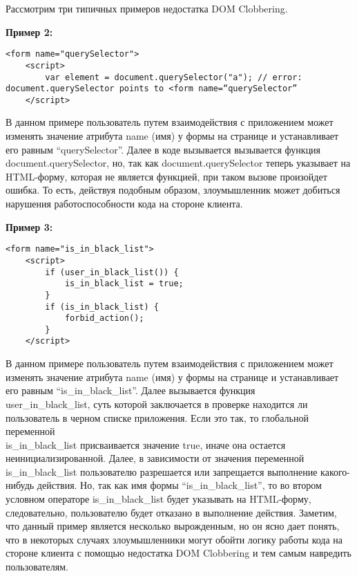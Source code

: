 Рассмотрим три типичных примеров недостатка DOM Clobbering.

\bigskip
\textbf{Пример 2:}


\begin{lstlisting}[caption=вызов ошибки]
	<form name="querySelector">
	<script>
		var element = document.querySelector("a"); // error: document.querySelector points to <form name=“querySelector”
	</script>
\end{lstlisting}
\bigskip

В данном примере пользователь путем взаимодействия с приложением может изменять значение атрибута name (имя) у формы на странице и устанавливает его равным “querySelector”. Далее в коде вызывается вызывается функция document.querySelector, но, так как document.querySelector теперь указывает на \\HTML-форму, которая не является функцией, при таком вызове произойдет ошибка.
То есть, действуя подобным образом, злоумышленник может добиться нарушения работоспособности кода на стороне клиента.

\bigskip
\textbf{Пример 3:}

\begin{lstlisting}[caption=обход логики программы]
	<form name="is_in_black_list">
	<script>
		if (user_in_black_list()) {
			is_in_black_list = true;
		}
		if (is_in_black_list) {
			forbid_action();
		}
	</script>
\end{lstlisting}
\bigskip

В данном примере пользователь путем взаимодействия с приложением может изменять значение атрибута name (имя) у формы на странице и устанавливает его равным “is\_in\_black\_list”. Далее вызывается функция \\user\_in\_black\_list, суть которой заключается в проверке находится ли пользователь в черном списке приложения. Если это так, то глобальной переменной \\is\_in\_black\_list присваивается значение true, иначе она остается неинициализированной. Далее, в зависимости от значения переменной is\_in\_black\_list пользователю разрешается или запрещается выполнение какого-нибудь действия. Но, так как имя формы  “is\_in\_black\_list”, то во втором условном операторе is\_in\_black\_list будет указывать на HTML-форму, следовательно, пользователю будет отказано в выполнение действия.
Заметим, что данный пример является несколько вырожденным, но он ясно дает понять, что в некоторых случаях злоумышленники могут обойти логику работы кода на стороне клиента с помощью недостатка DOM Clobbering и тем самым навредить пользователям.

